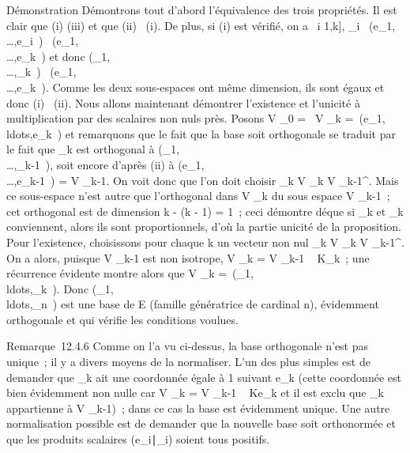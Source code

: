 \documentclass[]{article}
\begin{document}
Démonstration Démontrons tout d'abord l'équivalence des trois
propriétés. Il est clair que (i) \Leftrightarrow (iii) et
que (ii) \rigtharrow~(i). De plus, si (i) est vérifié, on a
\forall~i \in {[}1,k{]}, \epsilon\_i~
\in\mathrmVect(e\_1,\\\ldots,e\_i~)
\subset~\mathrmVect(e\_1,\\\ldots,e\_k~)
et donc
\mathrmVect(\epsilon\_1,\\\ldots,\epsilon\_k~)
\subset~\mathrmVect(e\_1,\\\ldots,e\_k~).
Comme les deux sous-espaces ont même dimension, ils sont égaux et donc
(i) \rigtharrow~(ii). Nous allons maintenant démontrer l'existence et l'unicité à
multiplication par des scalaires non nuls près. Posons V \_0 =
\0\, V \_k
=\
\mathrmVect(e\_1,\\ldots,e\_k~)
et remarquons que le fait que la base soit orthogonale se traduit par le
fait que \epsilon\_k est orthogonal à
\mathrmVect(\epsilon\_1,\\\ldots,\epsilon\_k-1~),
soit encore d'après (ii) à
\mathrmVect(e\_1,\\\ldots,e\_k-1~)
= V \_k-1. On voit donc que l'on doit choisir \epsilon\_k \in V
\_k \bigcap V \_k-1^\bot. Mais ce sous-espace n'est autre
que l'orthogonal dans V \_k du sous espace V \_k-1~; cet
orthogonal est de dimension k - (k - 1) = 1~; ceci démontre dé que si
\epsilon\_k et \eta\_k conviennent, alors ils sont proportionnels,
d'où la partie unicité de la proposition. Pour l'existence, choisissons
pour chaque k un vecteur non nul \epsilon\_k \in V \_k \bigcap V
\_k-1^\bot. On a alors, puisque V \_k-1 est non
isotrope, V \_k = V \_k-1 \oplus~ K\epsilon\_k~; une
récurrence évidente montre alors que V \_k
=\
\mathrmVect(\epsilon\_1,\\ldots,\epsilon\_k~).
Donc
(\epsilon\_1,\\ldots,\epsilon\_n~)
est une base de E (famille génératrice de cardinal n), évidemment
orthogonale et qui vérifie les conditions voulues.

Remarque~12.4.6 Comme on l'a vu ci-dessus, la base orthogonale n'est pas
unique~; il y a divers moyens de la normaliser. L'un des plus simples
est de demander que \epsilon\_k ait une coordonnée égale à 1 suivant
e\_k (cette coordonnée est bien évidemment non nulle car V
\_k = V \_k-1 \oplus~ Ke\_k et il est exclu que
\epsilon\_k appartienne à V \_k-1)~; dans ce cas la base est
évidemment unique. Une autre normalisation possible est de demander que
la nouvelle base soit orthonormée et que les produits scalaires
(e\_i∣\epsilon\_i) soient tous
positifs.
\end{document}
